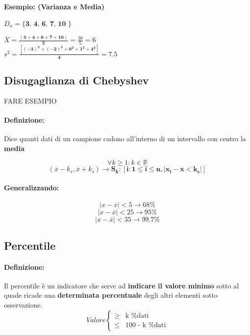 \documentclass[]{article}
\newcommand{\definizione}{\paragraph{Definizione:}}
\begin{document}
    \paragraph{Esempio: (Varianza e Media)} $D_n = \textbf{\{ 3, 4, 6, 7, 10 \}}$ \\
    \linebreak[2]
 
     $ \overline{X} = \boldsymbol{\frac{( 3 + 4 + 6 + 7 + 10)}{5}} = \frac{30}{5} = 6 $ \\

     $ s^2 = \boldsymbol{\frac{[ (-3)^2 + (-2)^2 + 0^2 + 1^2 + 4^2 ]}{4}} = 7.5 $ 

    \subsection{Disugaglianza di Chebyshev}
    FARE ESEMPIO
    \definizione Dice quanti dati di un campione cadono all'interno di un intervallo con centro la \textbf{media}

    \[ \forall k \geq 1 : k \in \mathbb{R} \]
    \[ (\overline{x} - k_s, \overline{x} + k_s) \longrightarrow \boldsymbol{S_k : [i : 1 \leq i \leq n, |x_i - \overline{x} < k_s|]} \]
    \paragraph{Generalizzando:}
    \[ |x - \overline{x}| < 5 \longrightarrow 68\% \]
    \[ |x - \overline{x}| < 25 \longrightarrow 95\% \]
    \[ |x - \overline{x}| < 35 \longrightarrow 99.7\% \]
    \subsection{Percentile}
    \definizione Il percentile è un indicatore che serve ad \textbf{indicare il valore minimo} sotto al quade ricade una \textbf{determinata percentuale} degli altri elementi sotto osservazione.
    \begin{equation*}
        Valore
        \begin{cases}
            \geq & \text{k \% dati} \\
            \leq & \text{100 - k \% dati}
        \end{cases}
    \end{equation*}
     \\
    \linebreak[3]
\end{document}
